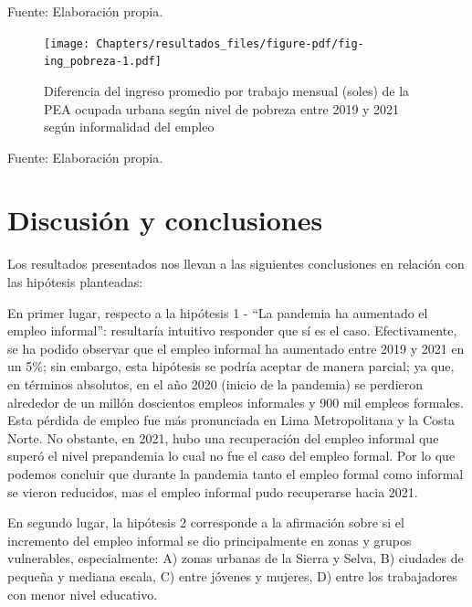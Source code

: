 \documentclass[
  letterpaper,
  12pt,
  oneside,
  spanish,
  doublespacing,
  headsepline,
  parskip]{MastersDoctoralThesis}
\begin{document}
\noindent \small Fuente: Elaboración propia. \normalsize

\begin{figure}

\caption{\label{fig-ing_pobreza}Diferencia del ingreso promedio por
trabajo mensual (soles) de la PEA ocupada urbana según nivel de pobreza
entre 2019 y 2021 según informalidad del empleo}

{\centering \texttt{[image: Chapters/resultados\_files/figure-pdf/fig-ing\_pobreza-1.pdf]}

}

\end{figure}

\noindent \small Fuente: Elaboración propia. \normalsize

\break


\hypertarget{discusiuxf3n-y-conclusiones}{%
\chapter{Discusión y conclusiones}\label{discusiuxf3n-y-conclusiones}}

Los resultados presentados nos llevan a las siguientes conclusiones en
relación con las hipótesis planteadas:

En primer lugar, respecto a la hipótesis 1 - ``La pandemia ha aumentado
el empleo informal'': resultaría intuitivo responder que sí es el caso.
Efectivamente, se ha podido observar que el empleo informal ha aumentado
entre 2019 y 2021 en un 5\%; sin embargo, esta hipótesis se podría
aceptar de manera parcial; ya que, en términos absolutos, en el año 2020
(inicio de la pandemia) se perdieron alrededor de un millón doscientos
empleos informales y 900 mil empleos formales. Esta pérdida de empleo
fue más pronunciada en Lima Metropolitana y la Costa Norte. No obstante,
en 2021, hubo una recuperación del empleo informal que superó el nivel
prepandemia lo cual no fue el caso del empleo formal. Por lo que podemos
concluir que durante la pandemia tanto el empleo formal como informal se
vieron reducidos, mas el empleo informal pudo recuperarse hacia 2021.

En segundo lugar, la hipótesis 2 corresponde a la afirmación sobre si el
incremento del empleo informal se dio principalmente en zonas y grupos
vulnerables, especialmente: A) zonas urbanas de la Sierra y Selva, B)
ciudades de pequeña y mediana escala, C) entre jóvenes y mujeres, D)
entre los trabajadores con menor nivel educativo.
\end{document}
